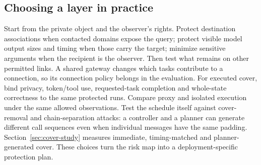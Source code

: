 \subsection{Choosing a layer in practice}
Start from the private object and the observer's rights. Protect destination associations when contacted domains expose the query; protect visible model output sizes and timing when those carry the target; minimize sensitive arguments when the recipient is the observer. Then test what remains on other permitted links. A shared gateway changes which tasks contribute to a connection, so its connection policy belongs in the evaluation. For executed cover, bind privacy, token/tool use, requested-task completion and whole-state correctness to the same protected runs. Compare proxy and isolated execution under the same allowed observations. Test the schedule itself against cover-removal and chain-separation attacks: a controller and a planner can generate different call sequences even when individual messages have the same padding. Section~\ref{sec:cover-study} measures immediate, timing-matched and planner-generated cover. These choices turn the risk map into a deployment-specific protection plan.
